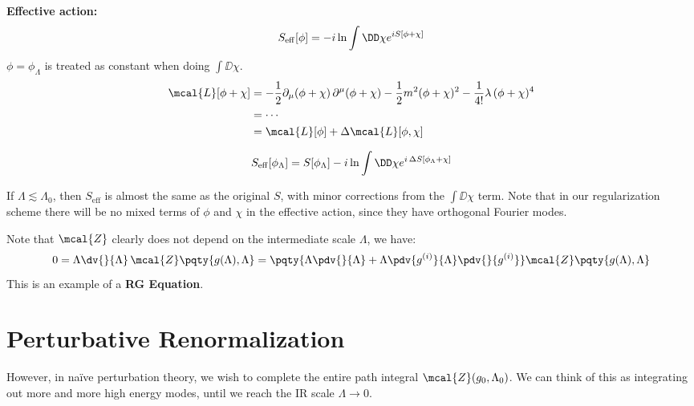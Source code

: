 \documentclass[a4paper,10pt]{article}
\begin{document}
	\textbf{Effective action:}
	\begin{equation}
	  S_{\mathrm{eff}}[\phi]
	  = -i \ln \int \DD \chi
	      e^{iS[\phi + \chi]} \\
	\end{equation}
	$\phi = \phi_\Lambda$ is treated as constant when doing
	$\int \DD \chi$.
	\begin{equation}
	\begin{aligned}
	  \mcal{L}[\phi + \chi]
	  &= - \frac{1}{2}
	      \partial_\mu (\phi + \chi)\,
	      \partial^\mu (\phi + \chi)
	    - \frac{1}{2} m^2
	      (\phi + \chi)^2
	    - \frac{1}{4!} \lambda\,
	      (\phi + \chi)^4\\
	  &= \cdots \\
	  &= \mcal{L}[\phi]
	    + \Delta\mcal{L} [\phi,\chi]
	\end{aligned}
	\end{equation}
	
	\begin{equation}
	  S_{\mathrm{eff}}[\phi_\Lambda]
	  = S[\phi_\Lambda]
	    - i \ln \int \DD \chi
	      e^{i\,\Delta S[\phi_\Lambda + \chi]} \\
	\end{equation}
	
	If $\Lambda \lesssim \Lambda_0$, then $S_{\mathrm{eff}}$ is almost
	the same as the original $S$, with minor corrections from the
	$\int \DD\chi$ term. Note that in our regularization scheme there will
	be no mixed terms of $\phi$ and $\chi$ in the effective action,
	since they have orthogonal Fourier modes.
	
	Note that $\mcal{Z}$ clearly does not depend on the intermediate scale $\Lambda$, we have:
	\begin{equation}
	  0
	  = \Lambda \dv{}{\Lambda}\,
	    \mcal{Z}\pqty{g(\Lambda),\Lambda}
	  = \pqty{
	      \Lambda \pdv{}{\Lambda}
	      + \Lambda \pdv{g^{(i)}}{\Lambda}
	        \pdv{}{g^{(i)}}
	    }
	    \mcal{Z}\pqty{g(\Lambda),\Lambda}
	\end{equation}
	This is an example of a \textbf{RG Equation}.
\section{Perturbative Renormalization}
	However, in naïve perturbation theory, we wish to complete the entire
	path integral $\mcal{Z} (g_0,\Lambda_0)$. We can think of this as
	integrating out more and more high energy modes, until we reach the IR
	scale $\Lambda \to 0$.
	
\end{document}
